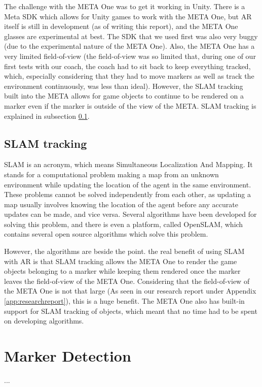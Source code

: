 		The challenge with the META One was to get it working in Unity.
		There is a Meta SDK which allows for Unity games to work with
		the META One, but AR itself is still in development (as of
		writing this report), and the META One glasses are experimental
		at best. The SDK that we used first was also very buggy (due to the
		experimental nature of the META One). Also, the META One has a very
		limited field-of-view (the field-of-view was so limited that, during
		one of our first tests with our coach, the coach had to sit back
		to keep everything tracked, which, especially considering that they
		had to move markers as well as track the environment continuously,
		was less than ideal). However, the SLAM tracking built into the
		META allows for game objects to continue to be rendered on a marker
		even if the marker is outside of the view of the META. SLAM tracking
		is explained in subsection \ref{ssec:slamloc}.
		
		\subsection{SLAM tracking} \label{ssec:slamloc}
			SLAM is an acronym, which means Simultaneous Localization And
			Mapping. It stands for a computational problem making a map
			from an unknown environment while updating the location of the
			agent in the same environment. These problems cannot be solved
			independently from each other, as updating a map usually involves
			knowing the location of the agent before any accurate updates
			can be made, and vice versa. Several algorithms have been developed
			for solving this problem, and there is even a platform, called OpenSLAM,
			which contains several open source algorithms which solve this
			problem.
			
			However, the algorithms are beside the point. the real benefit of 
			using SLAM with AR is that SLAM tracking allows the META One to
			render the game objects belonging to a marker while keeping them
			rendered once the marker leaves the field-of-view of the META One.
			Considering that the field-of-view of the META One is not that large
			(As seen in our research report under Appendix \ref{app:researchreport}),
			this is a huge benefit. The META One also has built-in support for
			SLAM tracking of objects, which meant that no time had to be spent
			on developing algorithms.

	\section{Marker Detection} \label{sec:markerdetection}
		...
		
